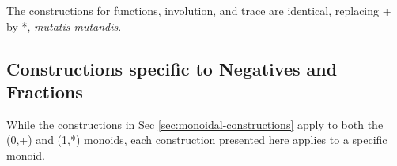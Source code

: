 \documentclass[preprint]{sigplanconf}
\newcommand{\lcal}{\ensuremath{\lambda}-calculus\xspace}
\begin{document}

The constructions for functions, involution, and trace are identical,
replacing {{+}} by {{*}}, \textit{mutatis mutandis}.



\subsection{Constructions specific to Negatives and Fractions}
\label{sec:specific-constructions}

While the constructions in Sec \ref{sec:monoidal-constructions} apply
to both the {{(0,+)}} and {{(1,*)}} monoids, each construction
presented here applies to a specific monoid. 
\end{document}
